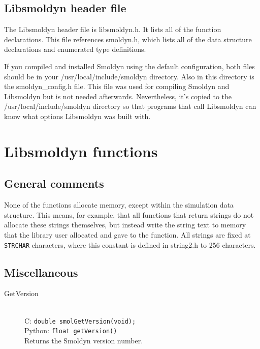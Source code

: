 \documentclass {book}
\begin{document}
\section{Libsmoldyn header file}

The Libsmoldyn header file is libsmoldyn.h. It lists all of the function declarations. This file references smoldyn.h, which lists all of the data structure declarations and enumerated type definitions.

If you compiled and installed Smoldyn using the default configuration, both files should be in your /usr/local/include/smoldyn directory. Also in this directory is the smoldyn\_config.h file. This file was used for compiling Smoldyn and Libsmoldyn but is not needed afterwards. Nevertheless, it's copied to the /usr/local/include/smoldyn directory so that programs that call Libsmoldyn can know what options Libsmoldyn was built with.


\chapter{Libsmoldyn functions}

\section{General comments}

None of the functions allocate memory, except within the simulation data structure. This means, for example, that all functions that return strings do not allocate these strings themselves, but instead write the string text to memory that the library user allocated and gave to the function.
All strings are fixed at \texttt{STRCHAR} characters, where this constant is defined in string2.h to 256 characters.

\section{Miscellaneous}

\begin{description}

\item[GetVersion]
\hfill \\
C: \texttt{double smolGetVersion(void);}\\
Python: \texttt{float getVersion()}\\
Returns the Smoldyn version number.

\end{description}
\end{document}
